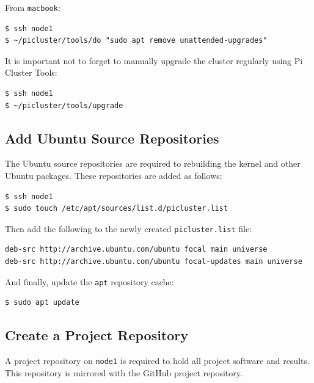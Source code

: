 \documentclass{report}
\begin{document}
From \verb|macbook|:

\lstset{style=type}
\begin{lstlisting}[]
$ ssh node1
$ ~/picluster/tools/do "sudo apt remove unattended-upgrades"
\end{lstlisting}

It is important not to forget to manually upgrade the cluster regularly using Pi Cluster Tools:

\lstset{style=type}
\begin{lstlisting}[]
$ ssh node1
$ ~/picluster/tools/upgrade
\end{lstlisting}



%
%
\subsection{Add Ubuntu Source Repositories}

The Ubuntu source repositories are required to rebuilding the kernel and other Ubuntu packages. These repositories are added as follows:

\lstset{style=type}
\begin{lstlisting}[]
$ ssh node1
$ sudo touch /etc/apt/sources/list.d/picluster.list
\end{lstlisting}

Then add the following to the newly created \verb|picluster.list| file:

\lstset{style=listing}
\begin{lstlisting}[caption=/etc/apt/sources.list.d/picluster.list]
deb-src http://archive.ubuntu.com/ubuntu focal main universe
deb-src http://archive.ubuntu.com/ubuntu focal-updates main universe
\end{lstlisting}

And finally, update the \verb|apt| repository cache:

\lstset{style=type}
\begin{lstlisting}[]
$ sudo apt update
\end{lstlisting}



\subsection{Create a Project Repository}

A project repository on \verb|node1| is required to hold all project software and results. This repository is mirrored with the GitHub project repository.
\end{document}
